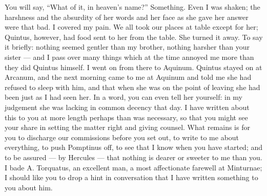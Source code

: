  You will say, ``What of it, in heaven's name?'' Something. Even I was shaken; the harshness and the absurdity of her words and her face as she gave her answer were that bad. I covered my pain. We all took our places at table except for her; Quintus, however, had food sent to her from the table. She turned it away. To say it briefly: nothing seemed gentler than my brother, nothing harsher than your sister --- and I pass over many things which at the time annoyed me more than they did Quintus himself. I went on from there to Aquinum. Quintus stayed on at Arcanum, and the next morning came to me at Aquinum and told me she had refused to sleep with him, and that when she was on the point of leaving she had been just as I had seen her. In a word, you can even tell her yourself: in my judgement she was lacking in common decency that day. I have written about this to you at more length perhaps than was necessary, so that you might see your share in setting the matter right and giving counsel. What remains is for you to discharge our commissions before you set out, to write to me about everything, to push Pomptinus off, to see that I know when you have started; and to be assured --- by Hercules --- that nothing is dearer or sweeter to me than you. I bade A. Torquatus, an excellent man, a most affectionate farewell at Minturnae; I should like you to drop a hint in conversation that I have written something to you about him.
